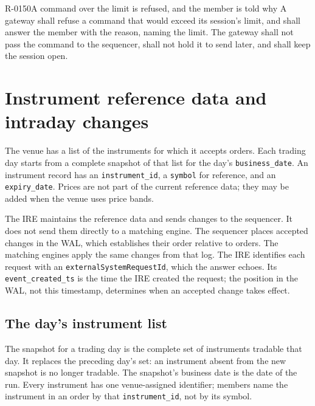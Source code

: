 \begin{requirement}{R-0150}{A command over the limit is refused, and the member is told why}
  A gateway shall refuse a command that would exceed its session's limit, and shall answer
  the member with the reason, naming the limit. The gateway shall not pass the command to
  the sequencer, shall not hold it to send later, and shall keep the session open.
\end{requirement}

\section{Instrument reference data and intraday changes}
\label{sec:instrument_reference_data}

The venue has a list of the instruments for which it accepts orders. Each
trading day starts from a complete snapshot of that list for the day's
\texttt{business\_date}. An instrument record has an \texttt{instrument\_id},
a \texttt{symbol} for reference, and an \texttt{expiry\_date}. Prices are not
part of the current reference data; they may be added when the venue uses
price bands.

The IRE maintains the reference data and sends changes to the sequencer. It
does not send them directly to a matching engine. The sequencer places
accepted changes in the WAL, which establishes their order relative to orders.
The matching engines apply the same changes from that log. The IRE identifies
each request with an \texttt{externalSystemRequestId}, which the answer echoes.
Its \texttt{event\_created\_ts} is the time the IRE created the request; the
position in the WAL, not this timestamp, determines when an accepted change
takes effect.

\subsection{The day's instrument list}

The snapshot for a trading day is the complete set of instruments tradable
that day. It replaces the preceding day's set: an instrument absent from the
new snapshot is no longer tradable. The snapshot's business date is the date
of the run. Every instrument has one venue-assigned identifier; members name
the instrument in an order by that \texttt{instrument\_id}, not by its symbol.

